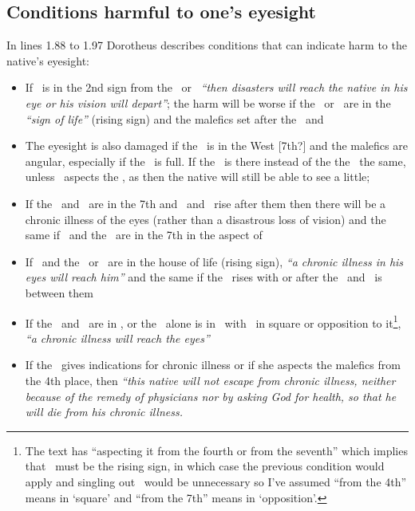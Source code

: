 \subsection{Conditions harmful to one's eyesight}
In lines 1.88 to 1.97 Dorotheus describes conditions that can indicate harm to the native's eyesight:
\begin{itemize}[topsep=0em,itemsep=0em]
\item If \Mars\, is in the 2nd sign from the \Sun\, or \Moon\, \textsl{``then disasters will reach the native in his eye or his vision will depart''}; the harm will be worse if the \Sun\, or \Moon\, are in the \textsl{``sign of life''} (rising sign) and the malefics set after the \Sun\, and \Moon

\item The eyesight is also damaged if the \Moon\, is in the West [7th?] and the malefics are angular, especially if the \Moon\, is full. If the \Sun\, is there instead of the the \Moon\, the same, unless \Jupiter\, aspects the \Sun, as then the native will still be able to see a little; 

\item If the \Sun\, and \Moon\, are in the 7th and \Saturn\, and \Mars\, rise after them then there will be a chronic illness of the eyes (rather than a disastrous loss of vision) and the same if \Mars\, and the \Sun\, are in the 7th in the aspect of \Jupiter

\item If \Mars\, and the \Sun\, or \Moon\, are in the house of life (rising sign), \textsl{``a chronic illness in his eyes will reach him''} and the same if the \Sun\, rises with or after the \Moon\, and \Mars\, is between them

\item If the \Moon\, and \Saturn\, are in \Sagittarius, or the \Moon\, alone is in \Sagittarius\, with \Saturn\, in square or opposition to it\footnote{The text has ``aspecting it from the fourth or from the seventh'' which implies that \Sagittarius\, must be the rising sign, in which case the previous condition would apply and singling out \Sagittarius\, would be unnecessary so I've assumed ``from the 4th'' means in `square' and ``from the 7th'' means in `opposition'.}, \textsl{``a chronic illness will reach the eyes''}

\item If the \Moon\, gives indications for chronic illness or if she aspects the malefics from the 4th place, then \textsl{``this native will not escape from chronic illness, neither because of the remedy of physicians nor by asking God for health, so that he will die from his chronic illness.}

\end{itemize}

